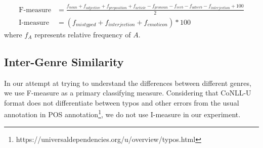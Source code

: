 \begin{align}
    \text{F-measure} &= \textstyle{\frac{f_{noun} + f_{adjective} + f_{preposition} + f_{article} - f_{pronoun} - f_{verb} - f_{adverb} - f_{interjection} + 100}{2}} \label{eqn:formality}\\
    \text{I-measure} &= (f_{mistyped} + f_{interjection} + f_{emoticon}) * 100 \label{eqn:informality}
\end{align}
where $f_{A}$ represents relative frequency of $A$.

\subsection{Inter-Genre Similarity}

In our attempt at trying to understand the differences between different genres, we use F-measure as a primary classifying measure. Considering that CoNLL-U format does not differentiate between typos and other errors from the usual annotation in POS annotation\footnote{https://universaldependencies.org/u/overview/typos.html}, we do not use I-measure in our experiment.
